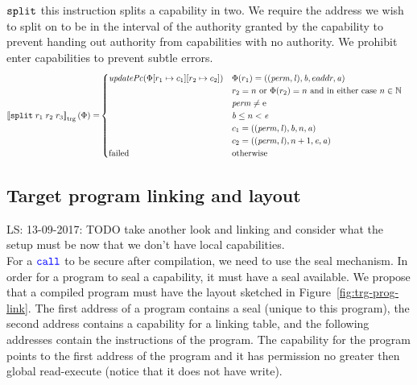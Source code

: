 \documentclass[a4paper]{article}
\newcommand\lau[1]{{\color{purple} \sf \footnotesize {LS: #1}}\\}
\newcommand{\sem}[1]{\left\llbracket #1 \right\rrbracket}
\newcommand{\tsem}[2][\Phi]{\sem{#2}_{\mathrm{trg}}(#1)}
\newcommand{\totherwise}{\text{otherwise }}
\newcommand{\sourcecolor}[1]{\color{blue}}
\newcommand{\src}[1]{{\sourcecolor{} #1}}
\newcommand{\targetcolor}[1]{\color{black}}
\newcommand{\trg}[1]{{\targetcolor{} #1}}
\newcommand{\zinstr}[1]{\texttt{#1}}
\newcommand{\twoinstr}[3]{
  \ifthenelse{\equal{#2#3}{}}
  {\zinstr{#1}}
  {\zinstr{#1} \; #2 \; #3}
}
\newcommand{\threeinstr}[4]{
  \ifthenelse{\equal{#2#3#4}{}}
  {\zinstr{#1}}
  {\zinstr{#1} \; #2 \; #3 \; #4}
}
\newcommand{\scall}[2]{\twoinstr{\src{call}}{#1}{#2}}
\newcommand{\tsplit}[3]{\threeinstr{\trg{split}}{#1}{#2}{#3}}
\newcommand{\nats}{\mathbb{N}}
\newcommand{\update}[2]{[#1 \mapsto #2]}
\newcommand{\perm}{\var{perm}}
\newcommand{\lin}{\var{l}}
\newcommand{\failed}{\mathrm{failed}}
\newcommand{\var}[1]{\mathit{#1}}
\newcommand{\baddr}{\var{b}}
\newcommand{\eaddr}{\var{e}}
\newcommand{\aaddr}{\var{a}}
\newcommand{\plainperm}[1]{\mathrm{#1}}
\newcommand{\enter}{\plainperm{e}}
\newcommand{\plainfun}[2]{
  \ifthenelse{\equal{#2}{}}
  {\mathit{#1}}
  {\mathit{#1}(#2)}
}
\newcommand{\updPcAddr}[1]{\plainfun{updatePc}{#1}}
\begin{document}
$\tsplit{}{}{}$ this instruction splits a capability in two. We require the address we wish to split on to be in the interval of the authority granted by the capability to prevent handing out authority from capabilities with no authority. We prohibit enter capabilities to prevent subtle errors. 
\begin{align*}
  \tsem{\tsplit{r_1}{r_2}{r_3}} = &
                               \begin{cases}
                                 \updPcAddr{\Phi\update{r_1}{c_1}\update{r_2}{c_2}} &
                                 \arraycolsep=0pt
                                 \begin{array}[t]{l}
                                   \Phi(r_1) = ((\perm, \lin), \baddr, eaddr, \aaddr) \\
                                   r_2 = n \text{ or } \Phi(r_2) = n \text{ and in either case } n \in \nats\\
                                   \perm \neq \enter\\
                                   \baddr \leq n  < \eaddr\\
                                   c_1 = ((\perm,\lin),\baddr, n, \aaddr) \\
                                   c_2 = ((\perm,\lin),n + 1, \eaddr,\aaddr)
                                 \end{array} \\
                                 \failed & \totherwise
                               \end{cases}
\end{align*}


\subsection{Target program linking and layout}
\lau{13-09-2017: TODO take another look and linking and consider what the setup must be now that we don't have local capabilities.}
For a $\scall{}{}$ to be secure after compilation, we need to use the seal mechanism. In order for a program to seal a capability, it must have a seal available. We propose that a compiled program must have the layout sketched in Figure~\ref{fig:trg-prog-link}. The first address of a program contains a seal (unique to this program), the second address contains a capability for a linking table, and the following addresses contain the instructions of the program. The capability for the program points to the first address of the program and it has permission no greater then global read-execute (notice that it does not have write).
\end{document}
